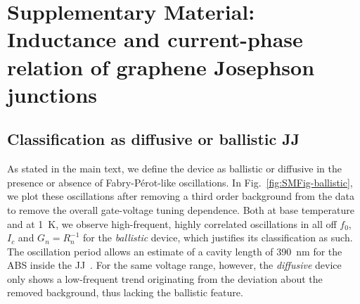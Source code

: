 


\section{Supplementary Material: Inductance and current-phase relation of graphene Josephson junctions}\label{sec:SM}

\subsection{Classification as diffusive or ballistic JJ}\label{sec:SMballistic}

As stated in the main text, we define the device as ballistic or diffusive in the presence or absence of Fabry-Pérot-like oscillations.
%
In Fig.~\ref{fig:SMFig-ballistic}, we plot these oscillations after removing a third order background from the data to remove the overall gate-voltage tuning dependence.
%
Both at base temperature and at \SI{1}{\kelvin}, we observe high-frequent, highly correlated oscillations in all off $f_0$, $I_c$ and $G_n=R_n^{-1}$ for the \textit{ballistic} device, which justifies its classification as such.
%
The oscillation period allows an estimate of a cavity length of \SI{390}{\nano\meter} for the ABS inside the JJ~\cite{schmidtBallisticGrapheneSuperconducting2018}.
%
For the same voltage range, however, the \textit{diffusive} device only shows a low-frequent trend originating from the deviation about the removed background, thus lacking the ballistic feature.

